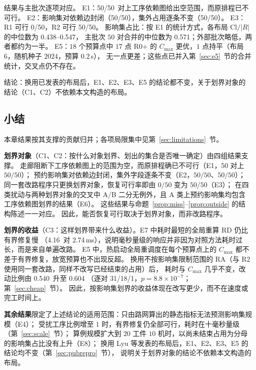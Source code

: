 \documentclass[manuscript,screen,review]{acmart}
\newcommand{\NPairs}{50}
\newcommand{\PassMiss}{\NPairs/\NPairs}      %
\newcommand{\FeasRone}{0/\NPairs}            %
\newcommand{\FeasRtwo}{\NPairs/\NPairs}      %
\newcommand{\PassClosed}{\NPairs/\NPairs}    %
\newcommand{\PassInvar}{\NPairs/\NPairs}     %
\newcommand{\EoneFracMed}{0.571}    %
\newcommand{\NPubPairs}{50}
\newcommand{\PubPassMiss}{\NPubPairs/\NPubPairs}
\newcommand{\PubFeasRone}{0/\NPubPairs}
\newcommand{\PubFeasRtwo}{\NPubPairs/\NPubPairs}
\newcommand{\PubPassClosed}{\NPubPairs/\NPubPairs}
\newcommand{\PubPassInvar}{\NPubPairs/\NPubPairs}
\newcommand{\PubEoneFracLo}{0.438}
\newcommand{\PubEoneFracHi}{0.547}
\newcommand{\MsRedecode}{4.16}       %
\newcommand{\MsCheapRtwo}{2.74}      %
\newcommand{\ResFracCheapRtwo}{0.540}
\newcommand{\ResFracAllFuture}{0.604}
\newcommand{\RAStabWTL}{31/18/1}     %
\newcommand{\RAStabP}{8.8\times10^{-7}}  %
\newcommand{\ScaleJobsHi}{20}
\newcommand{\ScaleMachHi}{10}
\begin{document}
结果与主批次逐项对应。
E1：\PubPassMiss\ 对上工序依赖图给出空范围，而原排程已不可行。
E2：影响集对依赖边封闭（\PubPassClosed），集外占用逐条不变（\PubPassInvar）。
E3：R1 可行 \PubFeasRone，R2 可行 \PubFeasRtwo。
影响集占比：按 E1 的统计方式，各布局 \(\mathrm{Cl}/|R|\) 的中位数为 \PubEoneFracLo--\PubEoneFracHi，
主批次 \(\NPairs\) 对合并的中位数为 \EoneFracMed；外部批次略低，两者都约为一半。
E5：\(18\) 个预算点中 \(17\) 点 R0+ 的 \(C_{\max}\) 更优，\(1\) 点持平（布局 6，随机种子 \(2024\)，预算 \(0.2\)\,s），
无一点更差；这些点已并入第~\ref{sec:e5}~节的合并统计，交叉点仍不存在。

结论：换用已发表的布局后，E1、E2、E3、E5 的结论都不变，关于划界对象的结论（C1、C2）不依赖本文构造的布局。

\subsection{小结}
\label{sec:exp_summary}

本章结果按其支撑的贡献归并；各项局限集中见第~\ref{sec:limitations}~节。

\textbf{划界对象}（C1、C2：按什么对象划界、划出的集合是否唯一确定）由四组结果支撑。
走廊阻断下工序依赖图上的范围为空，而原排程确已不可行（E1，\(\NPairs\) 对上 \(\PassMiss\)）；
预约影响集对依赖边封闭，集外字段逐条不变（E2，\(\PassClosed\)、\(\PassInvar\)）；
同一套改路程序只更换划界对象，恢复可行率即由 \(\FeasRone\) 变为 \(\FeasRtwo\)（E3）；
在四类扰动与两种划界对象的交叉中 A/B 二分无例外，且 A 类上预约影响集均包含工序依赖图划界的结果（E6）。
这些结果与命题~\ref{prop:miss}--\ref{prop:outside} 的结构陈述一一对应。
因此，能否恢复可行取决于划界对象，而非改路程序。

\textbf{划界的收益}（C3：这样划界带来什么收益）。E7 中耗时最短的全局重算 RD 仍比有界修复慢
（\MsRedecode\ 对 \MsCheapRtwo\,ms），说明毫秒量级的响应并非因为对照方法耗时过长，而是来自单遍改路。
E5 中，热启动全局重调度在每个预算点上的 \(C_{\max}\) 都不差于有界修复，放宽预算也不出现反超。
换用不按影响集限制范围的 RA（与 R2 使用同一套改路，同样不改写已经结束的占用）后，
耗时与 \(C_{\max}\) 几乎不变，改动比例由 \ResFracCheapRtwo\ 升至 \ResFracAllFuture
（逐对 \RAStabWTL，\(p=\RAStabP\)；第~\ref{sec:cheap}~节）。
因此，按影响集划界的收益体现在改写更少，而不在速度或完工时间上。

\textbf{其余结果}限定了上述结论的适用范围：只由路网算出的静态指标无法预测影响集规模（E4）；
受扰工序比例增至 \(1\) 时，有界修复仍全部可行，耗时在十毫秒量级（第~\ref{sec:scale}~节）；
算例规模扩大到 \(\ScaleJobsHi\) 工件 \(\ScaleMachHi\) 机时，以尚未结束占用为分母的影响集占比没有上升（E8）；
换用 Lyu 等发表的布局后，E1、E2、E3、E5 的结论均不变（第~\ref{sec:pubrepro}~节），
说明关于划界对象的结论不依赖本文构造的布局。
\end{document}
